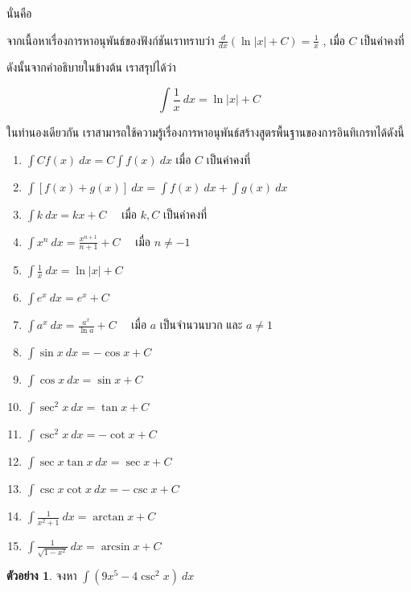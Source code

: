 \documentclass[
]{book}
\theoremstyle{definition}
\theoremstyle{definition}
\newtheorem{example}{ตัวอย่าง}[chapter]
\theoremstyle{definition}
\theoremstyle{definition}
\theoremstyle{remark}
\begin{document}
นั่นคือ

จากเนื้อหาเรื่องการหาอนุพันธ์ของฟังก์ชันเราทราบว่า
\(\displaystyle \frac{d}{dx} \left( \ln |x|+C
\right)=\frac{1}{x}\) , เมื่อ \(C\) เป็นค่าคงที่

ดังนั้นจากคำอธิบายในข้างต้น เราสรุปได้ว่า

\[\displaystyle \int \frac{1}{x} \ dx = \ln|x|+C\]

ในทำนองเดียวกัน
เราสามารถใช้ความรู้เรื่องการหาอนุพันธ์สร้างสูตรพื้นฐานของการอินทิเกรทได้ดังนี้

\begin{enumerate}
\def\labelenumi{\arabic{enumi}.}
\item
  \(\displaystyle \int C f(x) \ dx = C \int f(x) \ dx\) เมื่อ \(C\) เป็นค่าคงที่
\item
  \(\displaystyle \int [f(x)+g(x)] \ dx = \int f(x) \ dx+\int
  g(x) \ dx\)
\item
  \(\displaystyle \int k \ dx = kx+C \quad\) เมื่อ \(k, C\) เป็นค่าคงที่
\item
  \(\displaystyle \int x^{n} \ dx = \frac{x^{n+1}}{n+1}+C
  \quad\) เมื่อ \(n\neq -1\)
\item
  \(\displaystyle \int \frac{1}{x} \ dx = \ln|x|+C\)
\item
  \(\displaystyle \int e^{x} \ dx = e^{x}+C\)
\item
  \(\displaystyle \int a^{x} \ dx = \frac{a^{x}}{ \ln a}+C
  \quad\) เมื่อ \(a\) เป็นจำนวนบวก และ \(a\neq 1\)
\item
  \(\displaystyle \int \sin x \ dx = -\cos x+C\)
\item
  \(\displaystyle \int \cos x \ dx = \sin x+C\)
\item
  \(\displaystyle \int \sec^{2} x \ dx = \tan x+C\)
\item
  \(\displaystyle \int \csc^{2} x \ dx = -\cot x+C\)
\item
  \(\displaystyle \int \sec x \tan x \ dx = \sec x+C\)
\item
  \(\displaystyle \int \csc x \cot x \ dx = -\csc x+C\)
\item
  \(\displaystyle \int \frac{1}{x^{2}+1} \ dx = \arctan x+C\)
\item
  \(\displaystyle \int \frac{1}{\sqrt{1-x^{2}}} \ dx =
  \arcsin x+C\)
\end{enumerate}

\begin{example}
จงหา \(\displaystyle \int (9x^{5}-4 \csc^{2} x) \ dx\)
\end{example}
\end{document}
